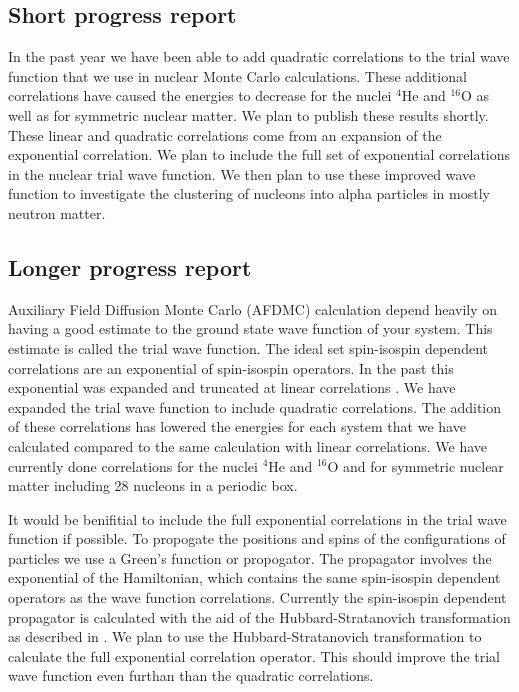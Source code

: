 \documentclass[12pt,letterpaper]{article}
\begin{document}
\subsection*{Short progress report}
In the past year we have been able to add quadratic correlations to the trial wave function that we use in nuclear Monte Carlo calculations. These additional correlations have caused the energies to decrease for the nuclei $^4$He and $^{16}$O as well as for symmetric nuclear matter. We plan to publish these results shortly.
These linear and quadratic correlations come from an expansion of the exponential correlation. We plan to include the full set of exponential correlations in the nuclear trial wave function. We then plan to use these improved wave function to investigate the clustering of nucleons into alpha particles in mostly neutron matter.

\subsection*{Longer progress report}
Auxiliary Field Diffusion Monte Carlo (AFDMC) calculation depend heavily on having a good estimate to the ground state wave function of your system. This estimate is called the trial wave function. The ideal set spin-isospin dependent correlations are an exponential of spin-isospin operators. In the past this exponential was expanded and truncated at linear correlations \cite{gandolfi2014}. We have expanded the trial wave function to include quadratic correlations. The addition of these correlations has lowered the energies for each system that we have calculated compared to the same calculation with linear correlations. We have currently done correlations for the nuclei $^4$He and $^{16}$O and for symmetric nuclear matter including 28 nucleons in a periodic box.

It would be benifitial to include the full exponential correlations in the trial wave function if possible. To propogate the positions and spins of the configurations of particles we use a Green's function or propogator. The propagator involves the exponential of the Hamiltonian, which contains the same spin-isospin dependent operators as the wave function correlations. Currently the spin-isospin dependent propagator is calculated with the aid of the Hubbard-Stratanovich transformation as described in \cite{carlson2015}. We plan to use the Hubbard-Stratanovich transformation to calculate the full exponential correlation operator. This should improve the trial wave function even furthan than the quadratic correlations.
\end{document}
